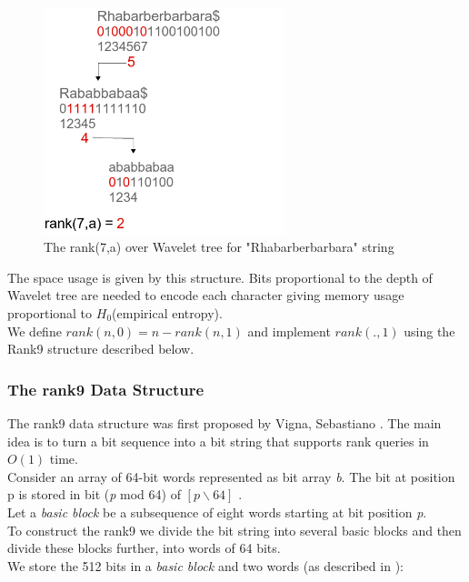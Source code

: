 \documentclass[11pt,a4paper]{report}
\begin{document}
\begin{figure}[H]
\centering
\includegraphics[width=7cm]{pictures/rank1.png}
\caption{The rank(7,a) over Wavelet tree for "Rhabarberbarbara" string }
\label{rank1}
\end{figure}

The space usage is given by this structure.
Bits proportional to the depth of  Wavelet tree are needed to encode
each character giving memory usage proportional to $H_{0}$(empirical entropy)\cite{entropy}.\\

We define \emph{$rank(n,0)= n- rank(n,1)$} and implement \emph{$rank(. , 1)$}
using the Rank9 structure described below.




\subsubsection{The rank9 Data Structure} \label{The rank9 Data Structure}


The rank9 data structure was first proposed by Vigna, Sebastiano \cite{rank9}.
The main idea is to turn a bit sequence into a bit string that supports
rank queries in $O(1)$ time.\\

Consider an array of 64-bit words represented as bit array \emph{b}.
The bit at position p is stored in bit (\emph{p} mod 64) of
$ [p \backslash 64]$ \cite{rank9}.\\ 
Let a \emph{basic block} be a subsequence of eight words 
starting at bit position \emph{p}.\\
To construct the rank9  we divide the bit string into several basic
blocks and then divide these blocks further, into words of 64 bits.\\
We store the 512 bits in a \emph{basic block} and two words (as described in \cite{rank9}):
\end{document}
